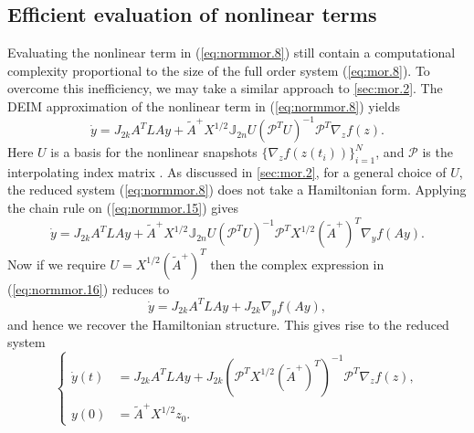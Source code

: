 \subsection{Efficient evaluation of nonlinear terms} \label{sec:normmor.3}
Evaluating the nonlinear term in (\ref{eq:normmor.8}) still contain a computational complexity proportional to the size of the full order system (\ref{eq:mor.8}). To overcome this inefficiency, we may take a similar approach to \cref{sec:mor.2}. The DEIM approximation of the nonlinear term in (\ref{eq:normmor.8}) yields
\begin{equation} \label{eq:normmor.15}
	\dot y = J_{2k} A^TLAy + \tilde A ^+ X^{1/2} \mathbb J_{2n} U (\mathcal P^TU)^{-1}\mathcal  P^T \nabla_z f(z).
\end{equation}
Here $U$ is a basis for the nonlinear snapshots $\{\nabla_z f(z(t_i))\}_{i=1}^N$, and $\mathcal P$ is the interpolating index matrix \cite{Chaturantabut:2010cz}. As discussed in \cref{sec:mor.2}, for a general choice of $U$, the reduced system (\ref{eq:normmor.8}) does not take a Hamiltonian form. Applying the chain rule on (\ref{eq:normmor.15}) gives
\begin{equation} \label{eq:normmor.16}
	\dot y = J_{2k} A^TLAy + \tilde A ^+ X^{1/2} \mathbb J_{2n} U (\mathcal P^TU)^{-1} \mathcal P^T X^{1/2} (\tilde A^+)^T \nabla_y f(Ay).
\end{equation}
Now if we require $U = X^{1/2} (\tilde A^+)^T$ then the complex expression in (\ref{eq:normmor.16}) reduces to
\begin{equation} \label{eq:normmor.17}
	\dot y = J_{2k} A^TLAy + J_{2k} \nabla_y f(Ay),
\end{equation}
and hence we recover the Hamiltonian structure. This gives rise to the reduced system
\begin{equation} \label{eq:normmor.18}
\left\{
\begin{aligned}
	\dot y(t) &= J_{2k} A^TLAy + J_{2k} (\mathcal P^TX^{1/2} (\tilde A^+)^T)^{-1} \mathcal P^T \nabla_z f(z), \\
	y(0) &= \tilde A^+ X^{1/2} z_0.
\end{aligned}
\right.
\end{equation}

